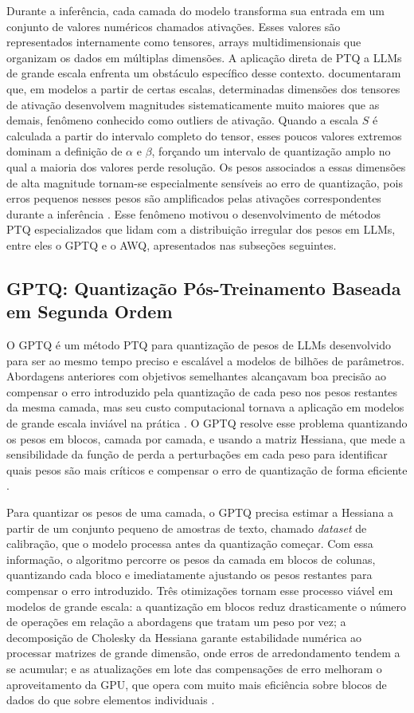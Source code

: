 Durante a inferência, cada camada do modelo transforma sua entrada em um conjunto de valores numéricos chamados ativações. Esses valores são representados internamente como tensores, arrays multidimensionais que organizam os dados em múltiplas dimensões. A aplicação direta de PTQ a LLMs de grande escala enfrenta um obstáculo específico desse contexto.  documentaram que, em modelos a partir de certas escalas, determinadas dimensões dos tensores de ativação desenvolvem magnitudes sistematicamente muito maiores que as demais, fenômeno conhecido como outliers de ativação. Quando a escala $S$ é calculada a partir do intervalo completo do tensor, esses poucos valores extremos dominam a definição de $\alpha$ e $\beta$, forçando um intervalo de quantização amplo no qual a maioria dos valores perde resolução. Os pesos associados a essas dimensões de alta magnitude tornam-se especialmente sensíveis ao erro de quantização, pois erros pequenos nesses pesos são amplificados pelas ativações correspondentes durante a inferência \cite{lin2024awq}. Esse fenômeno motivou o desenvolvimento de métodos PTQ especializados que lidam com a distribuição irregular dos pesos em LLMs, entre eles o GPTQ e o AWQ, apresentados nas subseções seguintes.

\subsection{GPTQ: Quantização Pós-Treinamento Baseada em Segunda Ordem} 

O GPTQ \cite{frantar2023gptq} é um método PTQ para quantização de pesos de LLMs desenvolvido para ser ao mesmo tempo preciso e escalável a modelos de bilhões de parâmetros. Abordagens anteriores com objetivos semelhantes alcançavam boa precisão ao compensar o erro introduzido pela quantização de cada peso nos pesos restantes da mesma camada, mas seu custo computacional tornava a aplicação em modelos de grande escala inviável na prática \cite{frantar2023gptq}. O GPTQ resolve esse problema quantizando os pesos em blocos, camada por camada, e usando a matriz Hessiana, que mede a sensibilidade da função de perda a perturbações em cada peso para identificar quais pesos são mais críticos e compensar o erro de quantização de forma eficiente \cite{frantar2023gptq}.

Para quantizar os pesos de uma camada, o GPTQ precisa estimar a Hessiana a partir de um conjunto pequeno de amostras de texto, chamado \textit{dataset} de calibração, que o modelo processa antes da quantização começar. Com essa informação, o algoritmo percorre os pesos da camada em blocos de colunas, quantizando cada bloco e imediatamente ajustando os pesos restantes para compensar o erro introduzido. Três otimizações tornam esse processo viável em modelos de grande escala: a quantização em blocos reduz drasticamente o número de operações em relação a abordagens que tratam um peso por vez; a decomposição de Cholesky da Hessiana garante estabilidade numérica ao processar matrizes de grande dimensão, onde erros de arredondamento tendem a se acumular; e as atualizações em lote das compensações de erro melhoram o aproveitamento da GPU, que opera com muito mais eficiência sobre blocos de dados do que sobre elementos individuais \cite{frantar2023gptq}.

